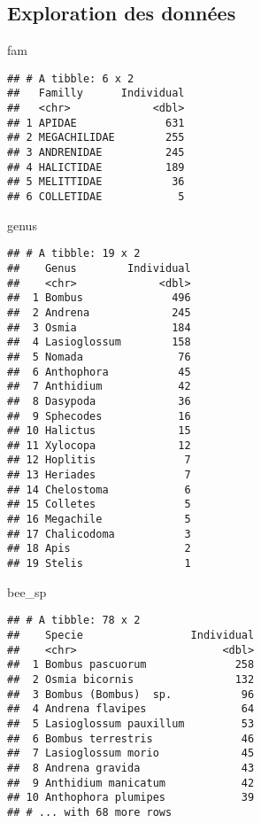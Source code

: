\documentclass[
]{article}
\newenvironment{Shaded}{\begin{snugshade}}{\end{snugshade}}
\newcommand{\NormalTok}[1]{#1}
\begin{document}
\hypertarget{exploration-des-donnuxe9es}{%
\subsection{Exploration des données}\label{exploration-des-donnuxe9es}}

\begin{Shaded}
\begin{Highlighting}[]
\NormalTok{fam}
\end{Highlighting}
\end{Shaded}

\begin{verbatim}
## # A tibble: 6 x 2
##   Familly      Individual
##   <chr>             <dbl>
## 1 APIDAE              631
## 2 MEGACHILIDAE        255
## 3 ANDRENIDAE          245
## 4 HALICTIDAE          189
## 5 MELITTIDAE           36
## 6 COLLETIDAE            5
\end{verbatim}

\begin{Shaded}
\begin{Highlighting}[]
\NormalTok{genus}
\end{Highlighting}
\end{Shaded}

\begin{verbatim}
## # A tibble: 19 x 2
##    Genus        Individual
##    <chr>             <dbl>
##  1 Bombus              496
##  2 Andrena             245
##  3 Osmia               184
##  4 Lasioglossum        158
##  5 Nomada               76
##  6 Anthophora           45
##  7 Anthidium            42
##  8 Dasypoda             36
##  9 Sphecodes            16
## 10 Halictus             15
## 11 Xylocopa             12
## 12 Hoplitis              7
## 13 Heriades              7
## 14 Chelostoma            6
## 15 Colletes              5
## 16 Megachile             5
## 17 Chalicodoma           3
## 18 Apis                  2
## 19 Stelis                1
\end{verbatim}

\begin{Shaded}
\begin{Highlighting}[]
\NormalTok{bee\_sp}
\end{Highlighting}
\end{Shaded}

\begin{verbatim}
## # A tibble: 78 x 2
##    Specie                 Individual
##    <chr>                       <dbl>
##  1 Bombus pascuorum              258
##  2 Osmia bicornis                132
##  3 Bombus (Bombus)  sp.           96
##  4 Andrena flavipes               64
##  5 Lasioglossum pauxillum         53
##  6 Bombus terrestris              46
##  7 Lasioglossum morio             45
##  8 Andrena gravida                43
##  9 Anthidium manicatum            42
## 10 Anthophora plumipes            39
## # ... with 68 more rows
\end{verbatim}
\end{document}
